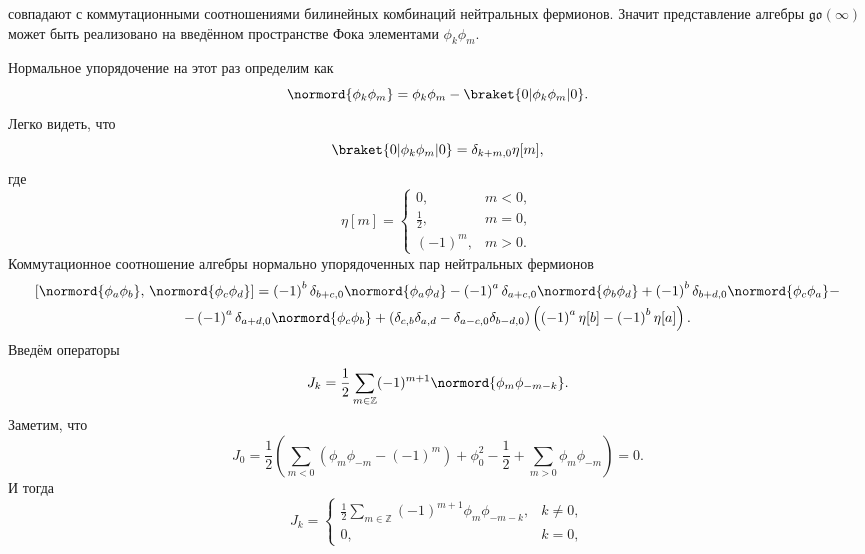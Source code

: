 \documentclass[a5paper,twoside]{article}
\begin{document}
совпадают с коммутационными соотношениями билинейных
комбинаций нейтральных фермионов. Значит представление
алгебры $\mathfrak{go}(\infty)$ может быть реализовано
на введённом пространстве Фока элементами $\phi_k \phi_m$.

Нормальное упорядочение на этот раз определим как
\begin{equation}
\normord{\phi_k \phi_m}= \phi_k \phi_m - \braket{0 | \phi_k
\phi_m| 0}
.\end{equation} 
Легко видеть, что 
\begin{equation}
	\braket{0 | \phi_k \phi_m | 0}=\delta_{k+m,0} \eta[m]
,\end{equation}
где
\begin{equation}
	\eta[m]= \begin{cases}
		0,& m<0,\\
		\frac{1}{2},& m=0,\\
		(-1)^m,& m>0.
	\end{cases}
\end{equation} 
Коммутационное соотношение алгебры нормально упорядоченных пар нейтральных
фермионов 
\begin{multline}
	\left[ \normord{\phi_a \phi_b},\,\normord{\phi_c \phi_d} \right] =\left( -1 \right) ^b \delta_{b+c,0}
	\normord{\phi_a \phi_d}-\left( -1 \right) ^a
	\delta_{a+c,0}
	\normord{\phi_b \phi_d}+\left( -1 \right) ^b
	\delta_{b+d,0}\normord{\phi_c \phi_a}-\\-
	\left( -1 \right) ^a \delta_{a+d,0}
	\normord{\phi_c \phi_b}+
	\left(\delta_{c,b}\delta_{a,d}-\delta_{a-c,0}
	\delta_{b-d,0}\right) \left( 
\left( -1 \right) ^a \eta[b]-\left( -1 \right) ^b \eta[a]\right) 
.\end{multline} 
Введём операторы
\begin{equation}
	J_k= \frac{1}{2} \sum_{m \in \mathbb{Z}}^{} (-1)^{m+1} \normord{\phi_m \phi_{-m-k}}
.\end{equation} 
Заметим, что
\[
J_0=\frac{1}{2}\left(\sum_{m<0}^{} \left( \phi_m \phi_{-m}-(-1)^m \right)+\phi_0^2-\frac{1}{2}+\sum_{m>0}^{} \phi_m \phi_{-m} \right)=0
.\] 
И тогда
\[
J_k = \begin{cases}
	\displaystyle \frac{1}{2} \sum_{m \in \mathbb{Z}}^{} (-1)^{m+1}
	\phi_m \phi_{-m-k},& k\neq 0,\\
	0,& k=0,
\end{cases}
\] 
\end{document}
